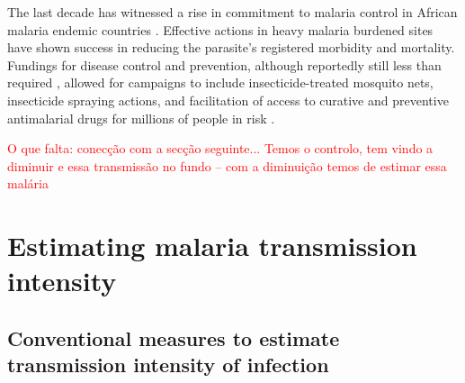 The last decade has witnessed a rise in commitment to malaria control in African malaria endemic countries \cite{kitua2011conquering}.
Effective actions in heavy malaria burdened sites have shown success in reducing the parasite's registered morbidity and mortality.
Fundings for disease control and prevention, although reportedly still less than required \cite{pigott2012funding}, allowed for campaigns to include insecticide-treated mosquito nets, insecticide spraying actions, and facilitation of access to curative and preventive antimalarial drugs for millions of people in risk \cite{who2017world}.

\textcolor{red}{O que falta: conecção com a secção seguinte... Temos o controlo, tem vindo a diminuir e essa transmissão no fundo -- com a diminuição temos de estimar essa malária}

\section{Estimating malaria transmission intensity}
\label{seq:estimating}


\subsection{Conventional measures to estimate transmission intensity of infection}

